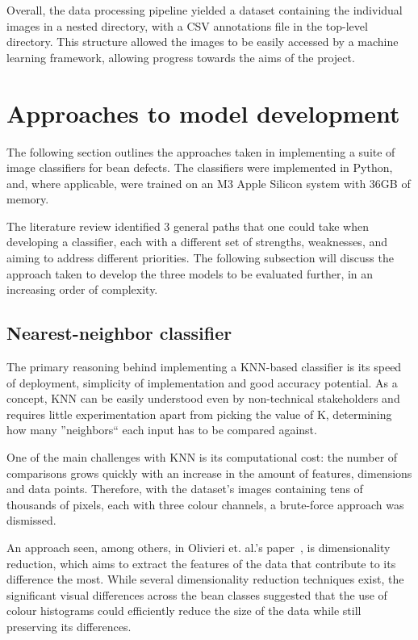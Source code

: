 Overall, the data processing pipeline yielded a dataset containing the individual images in a nested directory, with
a CSV annotations file in the top-level directory.
This structure allowed the images to be easily accessed by a machine learning framework, allowing progress towards the
aims of the project.


\section{Approaches to model development}
\label{sec:approaches-to-model-development}
The following section outlines the approaches taken in implementing a suite of image classifiers for bean defects.
The classifiers were implemented in Python, and, where applicable, were trained on an M3 Apple Silicon system with 36GB
of memory.

The literature review identified 3 general paths that one could take when developing a classifier, each with a different
set of strengths, weaknesses, and aiming to address different priorities.
The following subsection will discuss the approach taken to develop the three models to be evaluated further, in an
increasing order of complexity.
\subsection{Nearest-neighbor classifier}
\label{subsec:knn-classifier}
The primary reasoning behind implementing a KNN-based classifier is its speed of deployment, simplicity of implementation
and good accuracy potential.
As a concept, KNN can be easily understood even by non-technical stakeholders and requires little experimentation apart
from picking the value of K, determining how many ''neighbors`` each input has to be compared against.

One of the main challenges with KNN is its computational cost: the number of comparisons grows quickly with an increase
in the amount of features, dimensions and data points.
Therefore, with the dataset's images containing tens of thousands of pixels, each with three colour channels, a brute-force
approach was dismissed.

An approach seen, among others, in Olivieri et. al.'s paper~\cite{hyperspectralGreenOliveri}, is dimensionality reduction,
which aims to extract the features of the data that contribute to its difference the most.
While several dimensionality reduction techniques exist, the significant visual differences across the bean classes suggested
that the use of colour histograms could efficiently reduce the size of the data while still preserving its differences.

